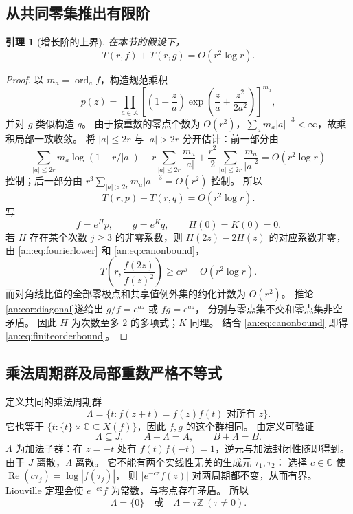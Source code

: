 \documentclass[11pt,a4paper,oneside,openany]{book}
\theoremstyle{lecture}
\newtheorem{lemma}[theorem]{引理}
\newcommand{\C}{\mathbb C}
\newcommand{\Z}{\mathbb Z}
\newcommand{\ord}{\operatorname{ord}}
\numberwithin{equation}{section}
\begin{document}
\subsection{从共同零集推出有限阶}
\begin{lemma}[增长阶的上界]\label{an:lem:finiteorder}
在本节的假设下，
\begin{equation}\label{an:eq:finiteorderbound}
 T(r,f)+T(r,g)=O(r^2\log r).
\end{equation}
\end{lemma}
\begin{proof}
以 $m_a=\ord_af$，构造规范乘积
\[
 p(z)=\prod_{a\in A}\left[\left(1-\frac za\right)
 \exp\left(\frac za+\frac{z^2}{2a^2}\right)\right]^{m_a},
\]
并对 $g$ 类似构造 $q$。
由于按重数的零点个数为 $O(r^2)$，$\sum_a m_a|a|^{-3}<\infty$，故乘积局部一致收敛。
将 $|a|\le2r$ 与 $|a|>2r$ 分开估计：前一部分由
\[
 \sum_{|a|\le2r}m_a\log(1+r/|a|)
 +r\sum_{|a|\le2r}\frac{m_a}{|a|}
 +\frac{r^2}2\sum_{|a|\le2r}\frac{m_a}{|a|^2}
 =O(r^2\log r)
\]
控制；后一部分由
$r^3\sum_{|a|>2r}m_a|a|^{-3}=O(r^2)$ 控制。
所以
\begin{equation}\label{an:eq:canonbound}
 T(r,p)+T(r,q)=O(r^2\log r).
\end{equation}
写
\[
 f=e^Hp,\qquad g=e^Kq,\qquad H(0)=K(0)=0.
\]
若 $H$ 存在某个次数 $j\ge3$ 的非零系数，则 $H(2z)-2H(z)$ 的对应系数非零，
由 \eqref{an:eq:fourierlower} 和 \eqref{an:eq:canonbound}，
\[
 T\left(r,\frac{f(2z)}{f(z)^2}\right)
 \ge cr^j-O(r^2\log r).
\]
而对角线比值的全部零极点和共享值例外集的约化计数为 $O(r^2)$。
推论\ref{an:cor:diagonal}遂给出 $g/f=e^{az}$ 或 $fg=e^{az}$，
分别与零点集不交和零点集非空矛盾。
因此 $H$ 为次数至多 $2$ 的多项式；$K$ 同理。
结合 \eqref{an:eq:canonbound} 即得 \eqref{an:eq:finiteorderbound}。
\end{proof}

\subsection{乘法周期群及局部重数严格不等式}
定义共同的乘法周期群
\begin{equation}\label{an:eq:Lambda}
 \Lambda=\{t:f(z+t)=f(z)f(t)\text{ 对所有 }z\}.
\end{equation}
它也等于 $\{t:\{t\}\times\C\subseteq X(f)\}$，因此 $f,g$ 的这个群相同。
由定义可验证
\begin{equation}\label{an:eq:Lambdafacts}
 \Lambda\subseteq J,\qquad A+\Lambda=A,\qquad B+\Lambda=B.
\end{equation}
$\Lambda$ 为加法子群：在 $z=-t$ 处有 $f(t)f(-t)=1$，逆元与加法封闭性随即得到。
由于 $J$ 离散，$\Lambda$ 离散。
它不能有两个实线性无关的生成元 $\tau_1,\tau_2$：
选择 $c\in\C$ 使 $\operatorname{Re}(c\tau_j)=\log|f(\tau_j)|$，
则 $|e^{-cz}f(z)|$ 对两周期都不变，从而有界。
Liouville 定理会使 $e^{-cz}f$ 为常数，与零点存在矛盾。
所以
\begin{equation}\label{an:eq:Lambdatypes}
 \Lambda=\{0\}\quad\text{或}\quad\Lambda=\tau\Z\ (\tau\ne0).
\end{equation}
\end{document}
